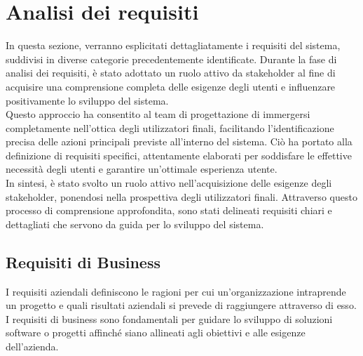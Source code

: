
\section{Analisi dei requisiti}
In questa sezione, verranno esplicitati dettagliatamente i requisiti del sistema,
suddivisi in diverse categorie precedentemente identificate. Durante la fase di
analisi dei requisiti, è stato adottato un ruolo attivo da stakeholder al fine di
acquisire una comprensione completa delle esigenze degli utenti e influenzare positivamente
lo sviluppo del sistema.\\

Questo approccio ha consentito al team di progettazione di immergersi completamente
nell'ottica degli utilizzatori finali, facilitando l'identificazione precisa delle
azioni principali previste all'interno del sistema. Ciò ha portato alla definizione
di requisiti specifici, attentamente elaborati per soddisfare le effettive necessità
degli utenti e garantire un'ottimale esperienza utente.\\

In sintesi, è stato svolto un ruolo attivo nell'acquisizione delle esigenze degli
stakeholder, ponendosi nella prospettiva degli utilizzatori finali. Attraverso
questo processo di comprensione approfondita, sono stati delineati requisiti
chiari e dettagliati che servono da guida per lo sviluppo del sistema.

\subsection{Requisiti di Business}
I requisiti aziendali definiscono le ragioni per cui un'organizzazione intraprende un progetto
e quali risultati aziendali si prevede di raggiungere attraverso di esso. I requisiti di
business sono fondamentali per guidare lo sviluppo di soluzioni software o progetti
affinché siano allineati agli obiettivi e alle esigenze dell'azienda.

